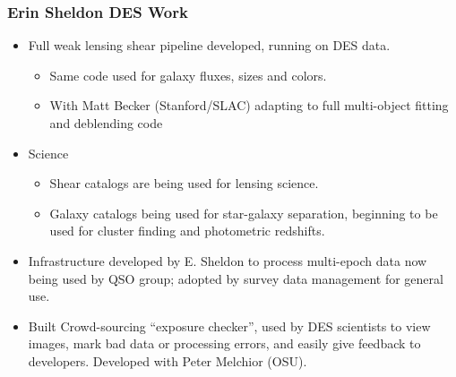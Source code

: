 \documentclass{beamer}
\begin{document}
\frame
{
    \frametitle{Erin Sheldon DES Work}

    \begin{itemize}

        \item Full weak lensing shear pipeline developed, running on DES data.

            \begin{itemize}

                \item Same code used for galaxy fluxes, sizes and colors.

                \item With Matt Becker (Stanford/SLAC) adapting to full
                    multi-object fitting and deblending code

            \end{itemize}

        \item Science
            \begin{itemize}

                \item Shear catalogs are being used for lensing science.

                \item Galaxy catalogs being used for star-galaxy separation, beginning
                    to be used for cluster finding and photometric redshifts.

            \end{itemize}

        \item Infrastructure developed by E. Sheldon to process multi-epoch data now
            being used by QSO group; adopted by survey data management for general use.

        \item Built Crowd-sourcing ``exposure checker'', used by DES scientists
            to view images, mark bad data or processing errors, and easily
            give feedback to developers.  Developed with Peter Melchior (OSU).

    \end{itemize}

}
\end{document}
